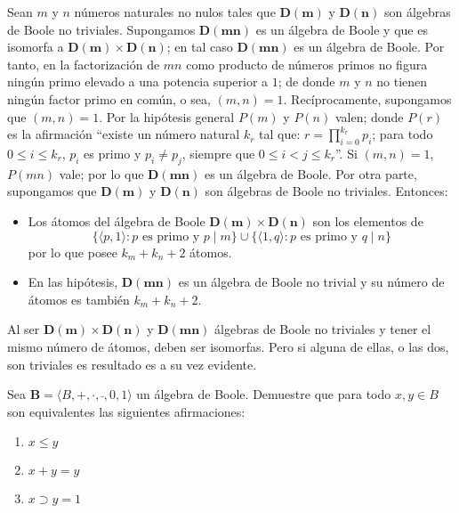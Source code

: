   \begin{solution}
    Sean $m$ y $n$ números naturales no nulos tales que
    $\mathbf{D(m)}$ y $\mathbf{D(n)}$ son álgebras de Boole no
    triviales. Supongamos $\mathbf{D(mn)}$ es un álgebra de Boole y
    que es isomorfa a $\mathbf{D(m)}\times\mathbf{D(n)}$; en tal caso
    $\mathbf{D(mn)}$ es un álgebra de Boole. Por tanto, en la
    factorización de $mn$ como producto de números primos no figura
    ningún primo elevado a una potencia superior a $1$; de donde $m$ y
    $n$ no tienen ningún factor primo en común, o sea,
    $(m,n)=1$. Recíprocamente, supongamos que $(m,n)=1$. Por la
    hipótesis general $P(m)$ y $P(n)$ valen; donde $P(r)$ es la
    afirmación ``existe un número natural $k_{r}$ tal que:
    $r=\prod_{i=0}^{k_{r}}p_{i}$; para todo $0\leq i\leq k_{r}$,
    $p_{i}$ es primo y $p_{i}\neq p_{j}$, siempre que
    $0\leq i<j\leq k_{r}$''. Si $(m,n)=1$, $P(mn)$ vale; por lo que
    $\mathbf{D(mn)}$ es un álgebra de Boole. Por otra parte,
    supongamos que $\mathbf{D(m)}$ y $\mathbf{D(n)}$ son álgebras de
    Boole no triviales. Entonces:
    \begin{itemize}
    \item Los átomos del álgebra de Boole
      $\mathbf{D(m)}\times\mathbf{D(n)}$ son los elementos de
      \begin{equation*}
        \{\langle p,1\rangle\colon p\text{ es primo y }p\mid m\}
        \cup
        \{\langle 1,q\rangle\colon p\text{ es primo y }q\mid n\}
      \end{equation*}
      por lo que posee $k_{m}+k_{n}+2$ átomos.
    \item En las hipótesis, $\mathbf{D(mn)}$ es un álgebra de Boole no
      trivial y su número de átomos es también $k_{m}+k_{n}+2$.
    \end{itemize}
    Al ser $\mathbf{D(m)}\times\mathbf{D(n)}$ y $\mathbf{D(mn)}$
    álgebras de Boole no triviales y tener el mismo número de átomos,
    deben ser isomorfas. Pero si alguna de ellas, o las dos, son
    triviales es resultado es a su vez evidente.
  \end{solution}

\begin{exercise}
  \label{ex:leqEquivalent}
  Sea $\mathbf{B}=\langle B,+,\cdot,\bar{\ },0,1\rangle$ un álgebra de
  Boole. Demuestre que para todo $x,y\in B$ son equivalentes las
  siguientes afirmaciones:
  \begin{enumerate}
  \item $x\leq y$
  \item $x+y=y$
  \item $x\supset y=1$
  \end{enumerate}
\end{exercise}

